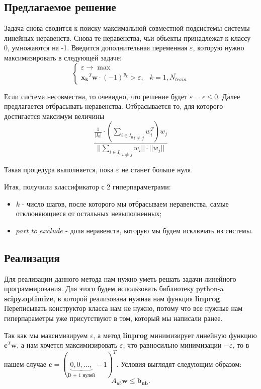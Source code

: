 \documentclass[a4paper]{article}
\newcommand{\w}{\bm{w}}
\newcommand{\xk}{\bm{x_k}}
\begin{document}
\subsection{Предлагаемое решение}
Задача снова сводится к поиску максимальной совместной подсистемы системы линейных неравенств. Снова те неравенства, чьи объекты принадлежат к классу 0, умножаются на -1. Введится дополнительная переменная $\varepsilon$, которую нужно максимизировать в следующей задаче:
\begin{equation}
\begin{cases}
\varepsilon \rightarrow \max \\
\xk^T\w \cdot (-1)^{y_k} > \varepsilon, & k = \overline{1, N_{train}}
\end{cases}
\end{equation}

Если система несовместна, то очевидно, что решение будет $\varepsilon = \epsilon \le 0$. Далее предлагается отбрасывать неравенства. Отбрасывается то, для которого достигается максимум величины $$\frac{\frac{1}{|I_0|} \cdot (\underset{i \neq j}{\underset{i \in I_0}{\sum}}w_i^T)w_j}{||\underset{i \neq j}{\underset{i \in I_0}{\sum}}w_i||\cdot ||w_j|| }$$

Такая процедура выполняется, пока $\varepsilon$ не станет больше нуля.

Итак, получили классификатор с 2 гиперпараметрами:
\begin{itemize}
\item $k$ - число шагов, после которого мы отбрасываем неравенства, самые отклюняющиеся от остальных невыполненных;
\item $part\_to\_exclude$ - доля неравенств, которую мы будем исключать из системы.
\end{itemize}

\subsection{Реализация}
Для реализации данного метода нам нужно уметь решать задачи линейного программирования. Для этого будем использовать библиотеку python-a \textbf{scipy.optimize}, в которой реализована нужная нам функция \textbf{linprog}. Переписывать конструктор класса нам не нужно, потому что все нужные нам гиперпараметры уже присутствуют в том, который мы написали ранее.

Так как мы максимизируем $\varepsilon$, а метод \textbf{linprog} минимизирует линейную функцию $\bm{c}^T\w$, а нам хочется максимизировать $\varepsilon$, что равносильно минимизации $- \varepsilon$, то в нашем случае $\bm{c} = (\underbrace{0, 0, ...,}_\text{D + 1 нулей}-1)^T$. Условия выглядят следующим образом:
\begin{equation}\label{08}
A_{ub}\w \le \bm{b_{ub}} .
\end{equation}
\end{document}
